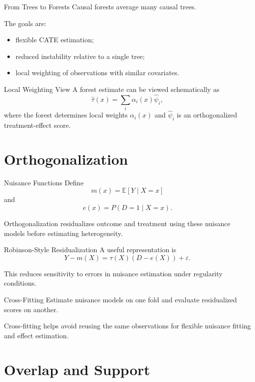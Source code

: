 \documentclass[aspectratio=169,11pt]{beamer}
\newcommand{\E}{\mathbb{E}}
\begin{document}
\begin{frame}{From Trees to Forests}
Causal forests average many causal trees.

The goals are:
\begin{itemize}
\item flexible CATE estimation;
\item reduced instability relative to a single tree;
\item local weighting of observations with similar covariates.
\end{itemize}
\end{frame}

\begin{frame}{Local Weighting View}
A forest estimate can be viewed schematically as
\[
\widehat\tau(x)
=
\sum_i \alpha_i(x)\widehat\psi_i,
\]
where the forest determines local weights \(\alpha_i(x)\) and \(\widehat\psi_i\) is an orthogonalized treatment-effect score.
\end{frame}

\section{Orthogonalization}

\begin{frame}{Nuisance Functions}
Define
\[
m(x)=\E[Y\mid X=x]
\]
and
\[
e(x)=P(D=1\mid X=x).
\]

Orthogonalization residualizes outcome and treatment using these nuisance models before estimating heterogeneity.
\end{frame}

\begin{frame}{Robinson-Style Residualization}
A useful representation is
\[
Y-m(X)
=
\tau(X)(D-e(X))
+
\varepsilon.
\]

This reduces sensitivity to errors in nuisance estimation under regularity conditions.
\end{frame}

\begin{frame}{Cross-Fitting}
Estimate nuisance models on one fold and evaluate residualized scores on another.

Cross-fitting helps avoid reusing the same observations for flexible nuisance fitting and effect estimation.
\end{frame}

\section{Overlap and Support}
\end{document}
